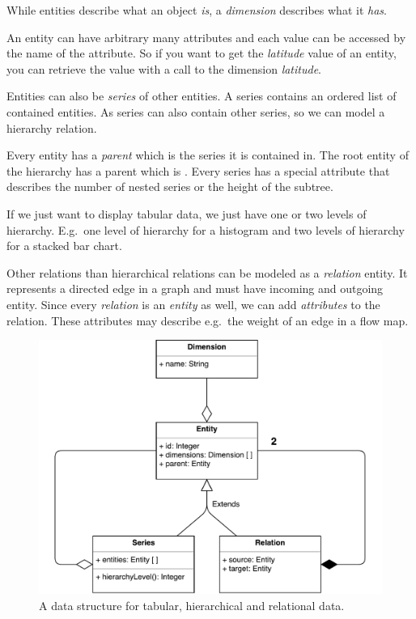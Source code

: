 While entities describe what an object \emph{is}, a \emph{dimension} describes what it \emph{has}.

An entity can have arbitrary many attributes and each value can be accessed by the name of the attribute.
So if you want to get the \emph{latitude} value of an entity, you can retrieve the value with a call to the dimension \emph{latitude}.

Entities can also be \emph{series} of other entities.
A series contains an ordered list of contained entities.
As series can also contain other series, so we can model a hierarchy relation.

Every entity has a \emph{parent} which is the series it is contained in.
The root entity of the hierarchy has a parent which is .
Every series has a special attribute  that describes the number of nested series or the height of the subtree.

If we just want to display tabular data, we just have one or two levels of hierarchy.
E.g.\ one level of hierarchy for a histogram and two levels of hierarchy for a stacked bar chart.

Other relations than hierarchical relations can be modeled as a \emph{relation} entity.
It represents a directed edge in a graph and must have incoming and outgoing entity.
Since every \emph{relation} is an \emph{entity} as well, we can add \emph{attributes} to the relation.
These attributes may describe e.g.\ the weight of an edge in a flow map.

\begin{figure}[ht]
  \centering
  \includegraphics[width=\textwidth]{figures/concept/DataModel}
  \caption{%
    A data structure for tabular, hierarchical and relational data.
  }\label{fig:concept:shared-data-model}
\end{figure}



